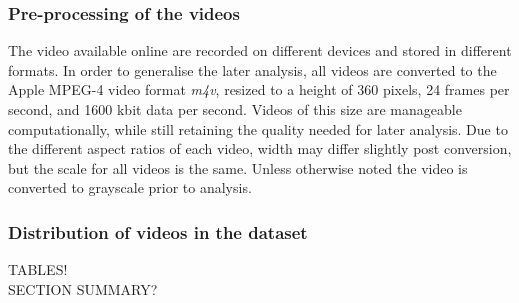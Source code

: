 \subsubsection{Pre-processing of the videos}
%
The video available online are recorded on different devices and stored in different formats. In order to generalise the later analysis, all videos are converted to the Apple MPEG-4 video format \textit{m4v}, resized to a height of 360 pixels, 24 frames per second, and 1600 kbit data per second. Videos of this size are manageable computationally, while still retaining the quality needed for later analysis. Due to the different aspect ratios of each video, width may differ slightly post conversion, but the scale for all videos is the same. Unless otherwise noted the video is converted to grayscale prior to analysis.
%
%
%
%
%
\subsubsection{Distribution of videos in the dataset}
%
TABLES!\\
%
SECTION SUMMARY?
